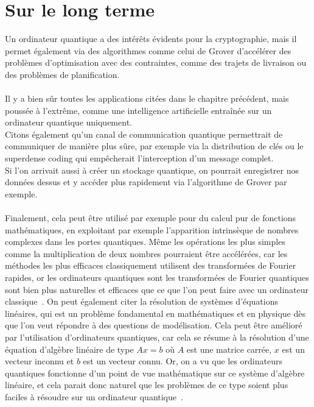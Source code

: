 \chapter{Sur le long terme}\label{ch:sur-le-long-terme}

Un ordinateur quantique a des intérêts évidents pour la cryptographie, mais il
permet également via des algorithmes comme celui de Grover d'accélérer des problèmes
d'optimisation avec des contraintes, comme des trajets de livraison ou des
problèmes de planification.\\ \\
Il y a bien sûr toutes les applications citées dans le chapitre précédent, mais
poussée à l'extrême, comme une intelligence artificielle entraînée sur un
ordinateur quantique uniquement.\\
Citons également qu'un canal de communication quantique permettrait de
communiquer de manière plus sûre, par exemple via la distribution de clés
ou le superdense coding qui empêcherait l'interception d'un message complet.\\
Si l'on arrivait aussi à créer un stockage quantique, on pourrait enregistrer
nos données dessus et y accéder plus rapidement via l'algorithme de Grover par
exemple.\\ \\
Finalement, cela peut être utilisé par exemple pour du calcul pur de fonctions
mathématiques, en exploitant par exemple l'apparition intrinsèque de
nombres complexes dans les portes quantiques.
Même les opérations les plus simples comme la multiplication de deux nombres
pourraient être accélérées, car les méthodes les plus efficaces classiquement utilisent
des transformées de Fourier rapides, or les ordinateurs quantiques sont les
transformées de Fourier quantiques sont bien plus naturelles et efficaces que
ce que l'on peut faire avec un ordinateur classique~\cite{mult-quant}.
On peut également citer la résolution de systèmes d'équations linéaires, qui
est un problème fondamental en mathématiques et en physique dès que l'on
veut répondre à des questions de modélisation.
Cela peut être amélioré par l'utilisation d'ordinateurs quantiques, car cela
se résume à la résolution d'une équation d'algèbre linéaire de type $Ax = b$
où $A$ est une matrice carrée, $x$ est un vecteur inconnu et $b$ est un vecteur
connu.
Or, on a vu que les ordinateurs quantiques fonctionne d'un point de vue mathématique
sur ce système d'algèbre linéaire, et cela parait donc naturel que les problèmes
de ce type soient plus faciles à résoudre sur un ordinateur quantique~\cite{Zhang2022}.\\ \\
